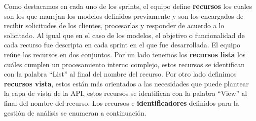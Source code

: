 Como destacamos en cada uno de los sprints, el equipo define \textbf{recursos} los cuales son los que manejan los modelos definidos previamente y son los encargados de recibir solicitudes de los clientes, procesarlas y responder de acuerdo a lo solicitado. Al igual que en el caso de los modelos, el objetivo o funcionalidad de cada recurso fue descripta en cada sprint en el que fue desarrollada. El equipo reúne los recursos en dos conjuntos. Por un lado tenemos los \textbf{recursos lista} los cuáles cumplen un procesamiento interno complejo, estos recursos se identifican con la palabra ``List'' al final del nombre del recurso. Por otro lado definimos \textbf{recursos vista}, estos están más orientados a las necesidades que puede plantear la capa de vista de la API, estos recursos se identifican con la palabra ``View'' al final del nombre del recurso. Los recursos e \textbf{identificadores} definidos para la gestión de análisis se enumeran a continuación.
